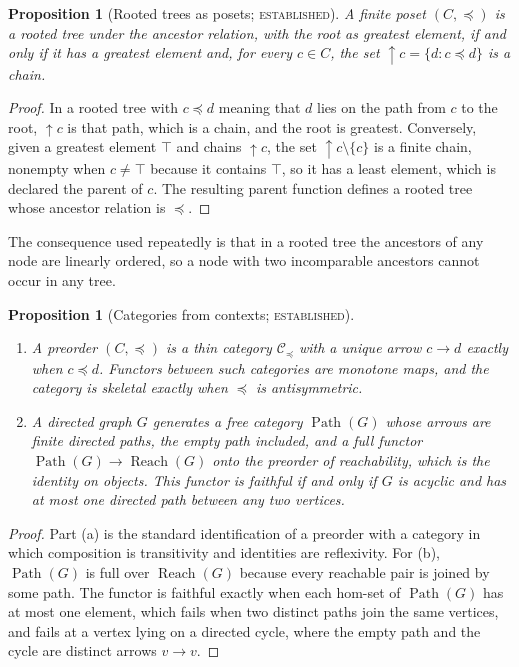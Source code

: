 \documentclass[11pt]{article}
\newtheorem{proposition}[theorem]{Proposition}
\theoremstyle{definition}
\theoremstyle{remark}
\newcommand{\stE}{\textsc{established}}
\newcommand{\cC}{\mathcal C}
\newcommand{\Path}{\operatorname{Path}}
\newcommand{\Reach}{\operatorname{Reach}}
\begin{document}
\begin{proposition}[Rooted trees as posets; \stE]\label{prop:treeposet}
A finite poset $(C,\preceq)$ is a rooted tree under the ancestor relation, with the root as greatest element, if and only if it has a greatest element and, for every $c\in C$, the set ${\uparrow}c=\{d: c\preceq d\}$ is a chain.
\end{proposition}
\begin{proof}
In a rooted tree with $c\preceq d$ meaning that $d$ lies on the path from $c$ to the root, ${\uparrow}c$ is that path, which is a chain, and the root is greatest. Conversely, given a greatest element $\top$ and chains ${\uparrow}c$, the set ${\uparrow}c\setminus\{c\}$ is a finite chain, nonempty when $c\neq\top$ because it contains $\top$, so it has a least element, which is declared the parent of $c$. The resulting parent function defines a rooted tree whose ancestor relation is $\preceq$.
\end{proof}

The consequence used repeatedly is that in a rooted tree the ancestors of any node are linearly ordered, so a node with two incomparable ancestors cannot occur in any tree.

\begin{proposition}[Categories from contexts; \stE]\label{prop:catfromctx}
\begin{enumerate}[label=(\alph*)]
\item A preorder $(C,\preceq)$ is a thin category $\cC_{\preceq}$ with a unique arrow $c\to d$ exactly when $c\preceq d$. Functors between such categories are monotone maps, and the category is skeletal exactly when $\preceq$ is antisymmetric.
\item A directed graph $G$ generates a free category $\Path(G)$ whose arrows are finite directed paths, the empty path included, and a full functor $\Path(G)\to\Reach(G)$ onto the preorder of reachability, which is the identity on objects. This functor is faithful if and only if $G$ is acyclic and has at most one directed path between any two vertices.
\end{enumerate}
\end{proposition}
\begin{proof}
Part (a) is the standard identification of a preorder with a category in which composition is transitivity and identities are reflexivity. For (b), $\Path(G)$ is full over $\Reach(G)$ because every reachable pair is joined by some path. The functor is faithful exactly when each hom-set of $\Path(G)$ has at most one element, which fails when two distinct paths join the same vertices, and fails at a vertex lying on a directed cycle, where the empty path and the cycle are distinct arrows $v\to v$.
\end{proof}
\end{document}
